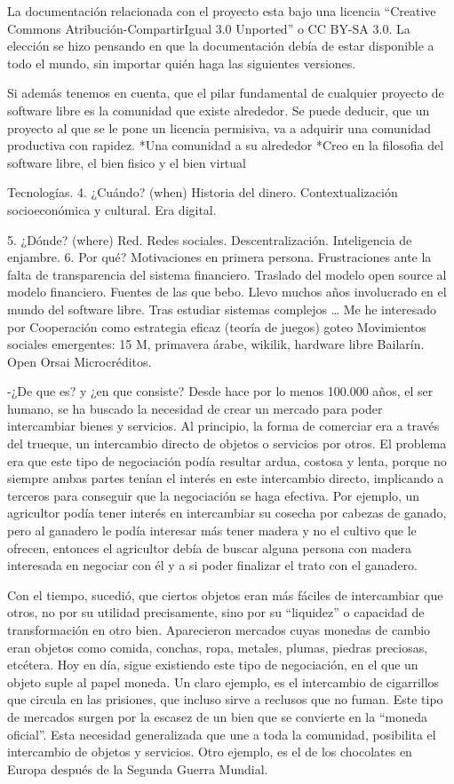 La documentación relacionada con el proyecto esta bajo una licencia ``Creative Commons Atribución-CompartirIgual 3.0 Unported'' o CC BY-SA 3.0. La elección se hizo pensando en que la documentación debía de estar disponible a todo el mundo, sin importar quién haga las siguientes versiones.


Si además tenemos en cuenta, que el pilar fundamental de cualquier proyecto de software libre es la comunidad que existe alrededor. Se puede deducir, que un proyecto al que se le pone un licencia permisiva, va a adquirir una comunidad productiva con rapidez.
*Una comunidad a su alrededor
*Creo en la filosofia del software libre, el bien fisico y el bien virtual

Tecnologías.
4. ¿Cuándo? (when) 
Historia del dinero.
Contextualización socioeconómica y cultural. Era digital.

5. ¿Dónde? (where) 
Red. Redes sociales.
Descentralización. Inteligencia de enjambre.
6. Por qué?
Motivaciones en primera persona.
Frustraciones ante la falta de transparencia del sistema financiero.
Traslado del modelo open source al modelo financiero. 
Fuentes de las que bebo.
Llevo muchos años involucrado en el mundo del software libre.
Tras estudiar sistemas complejos … 
Me he interesado por Cooperación como estrategia eficaz (teoría de juegos)
goteo
Movimientos sociales emergentes: 15 M, primavera  árabe, wikilik, hardware libre
Bailarín.
Open 
Orsai 
Microcréditos.



-¿De que es? y ¿en que consiste?
Desde hace por lo menos 100.000 años, el ser humano, se ha buscado la necesidad de crear un mercado para poder intercambiar bienes y servicios. Al principio, la forma de comerciar era a través del trueque, un intercambio directo de objetos o servicios por otros. El problema era que este tipo de negociación podía resultar ardua, costosa y lenta, porque no siempre ambas partes tenían el interés en este intercambio directo, implicando a terceros para conseguir que la negociación se haga efectiva. Por ejemplo, un agricultor podía tener interés en intercambiar su cosecha por cabezas de ganado, pero al ganadero le podía interesar más tener madera y no el cultivo que le ofrecen, entonces el agricultor debía de buscar alguna persona con madera interesada en negociar con él y a si poder finalizar el trato con el ganadero. 

Con el tiempo, sucedió, que ciertos objetos eran más fáciles de intercambiar que otros, no por su utilidad precisamente, sino por su ``liquidez'' o capacidad de transformación en otro bien.  Aparecieron mercados cuyas monedas de cambio eran objetos como comida, conchas, ropa, metales, plumas, piedras preciosas, etcétera. Hoy en día, sigue existiendo este tipo de negociación, en el que un objeto suple al papel moneda. Un claro ejemplo, es el intercambio de cigarrillos que circula en las prisiones, que incluso sirve a reclusos que no fuman. Este tipo de mercados surgen por la escasez de un bien que se convierte en la ``moneda oficial''. Esta necesidad generalizada que une a toda la comunidad, posibilita el intercambio de objetos y servicios. Otro ejemplo, es el de los chocolates en Europa después de la Segunda Guerra Mundial.

